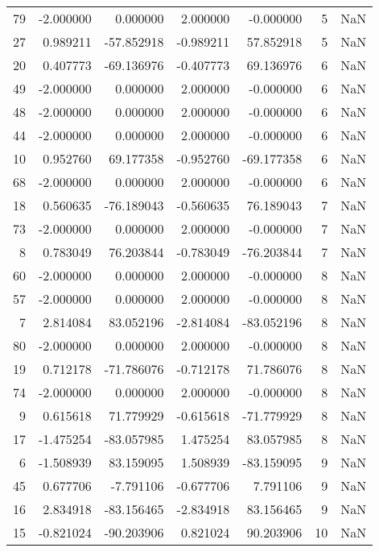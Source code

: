 \begin{tabular}{rrrrrrr}
79 & -2.000000 &   0.000000 &  2.000000 &   -0.000000 &           5 & NaN \\
27 &  0.989211 & -57.852918 & -0.989211 &   57.852918 &           5 & NaN \\
20 &  0.407773 & -69.136976 & -0.407773 &   69.136976 &           6 & NaN \\
49 & -2.000000 &   0.000000 &  2.000000 &   -0.000000 &           6 & NaN \\
48 & -2.000000 &   0.000000 &  2.000000 &   -0.000000 &           6 & NaN \\
44 & -2.000000 &   0.000000 &  2.000000 &   -0.000000 &           6 & NaN \\
10 &  0.952760 &  69.177358 & -0.952760 &  -69.177358 &           6 & NaN \\
68 & -2.000000 &   0.000000 &  2.000000 &   -0.000000 &           6 & NaN \\
18 &  0.560635 & -76.189043 & -0.560635 &   76.189043 &           7 & NaN \\
73 & -2.000000 &   0.000000 &  2.000000 &   -0.000000 &           7 & NaN \\
 8 &  0.783049 &  76.203844 & -0.783049 &  -76.203844 &           7 & NaN \\
60 & -2.000000 &   0.000000 &  2.000000 &   -0.000000 &           8 & NaN \\
57 & -2.000000 &   0.000000 &  2.000000 &   -0.000000 &           8 & NaN \\
 7 &  2.814084 &  83.052196 & -2.814084 &  -83.052196 &           8 & NaN \\
80 & -2.000000 &   0.000000 &  2.000000 &   -0.000000 &           8 & NaN \\
19 &  0.712178 & -71.786076 & -0.712178 &   71.786076 &           8 & NaN \\
74 & -2.000000 &   0.000000 &  2.000000 &   -0.000000 &           8 & NaN \\
 9 &  0.615618 &  71.779929 & -0.615618 &  -71.779929 &           8 & NaN \\
17 & -1.475254 & -83.057985 &  1.475254 &   83.057985 &           8 & NaN \\
 6 & -1.508939 &  83.159095 &  1.508939 &  -83.159095 &           9 & NaN \\
45 &  0.677706 &  -7.791106 & -0.677706 &    7.791106 &           9 & NaN \\
16 &  2.834918 & -83.156465 & -2.834918 &   83.156465 &           9 & NaN \\
15 & -0.821024 & -90.203906 &  0.821024 &   90.203906 &          10 & NaN \\

\end{tabular}
